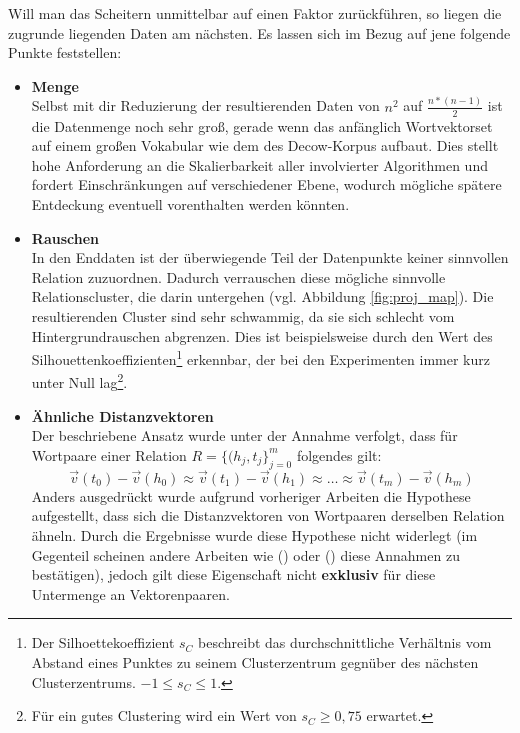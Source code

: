 Will man das Scheitern unmittelbar auf einen Faktor zurückführen, so liegen die zugrunde liegenden Daten am nächsten.
Es lassen sich im Bezug auf jene folgende Punkte feststellen:
\begin{itemize}
  \item \textbf{Menge}\\ Selbst mit dir Reduzierung der resultierenden Daten von $n^2$ auf $\frac{n*(n-1)}{2}$ ist die
  Datenmenge noch sehr groß, gerade wenn das anfänglich Wortvektorset auf einem großen Vokabular wie dem des Decow-Korpus aufbaut.
  Dies stellt hohe Anforderung an die Skalierbarkeit aller involvierter Algorithmen und fordert Einschränkungen auf verschiedener
  Ebene, wodurch mögliche spätere Entdeckung eventuell vorenthalten werden könnten.
  \item \textbf{Rauschen}\\ In den Enddaten ist der überwiegende Teil der Datenpunkte keiner sinnvollen Relation zuzuordnen.
  Dadurch verrauschen diese mögliche sinnvolle Relationscluster, die darin untergehen (vgl. Abbildung \ref{fig:proj_map}). Die resultierenden Cluster sind sehr
  schwammig, da sie sich schlecht vom Hintergrundrauschen abgrenzen. Dies ist beispielsweise durch den Wert des Silhouettenkoeffizienten\footnote{
  Der Silhoettekoeffizient $s_C$ beschreibt das durchschnittliche Verhältnis vom Abstand eines Punktes zu seinem Clusterzentrum gegnüber
  des nächsten Clusterzentrums. $-1 \leq s_C \leq 1$.}
  erkennbar, der bei den Experimenten immer kurz unter Null lag\footnote{Für ein gutes Clustering wird ein Wert von $s_C \geq 0,75$
  erwartet.}.
  \item \textbf{Ähnliche Distanzvektoren}\\
  Der beschriebene Ansatz wurde unter der Annahme verfolgt, dass für Wortpaare einer Relation $R=\{(h_j, t_j\}_{j=0}^m$
  folgendes gilt:
  \begin{equation}
    \vec{v}(t_0) - \vec{v}(h_0) \approx \vec{v}(t_1) - \vec{v}(h_1) \approx \ldots \approx \vec{v}(t_m) - \vec{v}(h_m)
  \end{equation}
  Anders ausgedrückt wurde aufgrund vorheriger Arbeiten die Hypothese aufgestellt, dass sich die Distanzvektoren von
  Wortpaaren derselben Relation ähneln. Durch die Ergebnisse wurde diese Hypothese nicht widerlegt (im Gegenteil scheinen
  andere Arbeiten wie (\cite{bordes2013translating}) oder (\cite{lin2015learning}) diese Annahmen zu bestätigen), jedoch
  gilt diese Eigenschaft nicht \textbf{exklusiv} für diese Untermenge an Vektorenpaaren.\\

\end{itemize}
